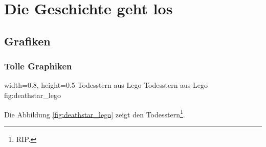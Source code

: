 \chapter{Die Geschichte geht los}

\section{Grafiken}

\subsection{Tolle Graphiken}

    {width=0.8\textwidth, height=0.5\textheight} %
    {Todesstern aus Lego}   %
    {Todesstern aus Lego}   %
    {fig:deathstar_lego}    %

Die Abbildung \ref{fig:deathstar_lego} zeigt den Todesstern\footnote{RIP.}.